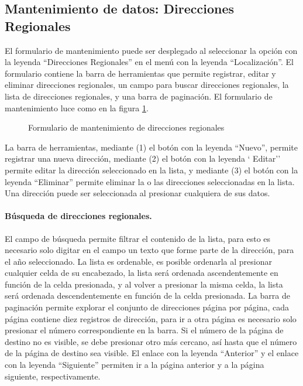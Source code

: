 \documentclass[a4paper, 9pt, conference]{article}              %
\begin{document}
\subsection{Mantenimiento de datos: Direcciones Regionales}

El formulario de mantenimiento puede ser desplegado al seleccionar la opci\'on con la leyenda ``Direcciones Regionales'' en el men\'u con la leyenda ``Localizaci\'on''. El formulario contiene la barra de herramientas que permite registrar, editar y eliminar direcciones regionales, un campo para buscar direcciones regionales, la lista de direcciones regionales, y una barra de paginaci\'on. El formulario de mantenimiento luce como en la figura \ref{fig:georegionals}.

\begin{figure}
	\centering
		\caption{Formulario de mantenimiento de direcciones regionales}
	\label{fig:georegionals}
\end{figure}

La barra de herramientas, mediante (1) el bot\'on con la leyenda ``Nuevo'', permite registrar una nueva direcci\'on, mediante (2) el bot\'on con la leyenda ` Editar'' permite editar la direcci\'on seleccionado en la lista, y mediante (3) el bot\'on con la leyenda ``Eliminar'' permite eliminar la o las direcciones seleccionadas en la lista. Una direcci\'on puede ser seleccionada al presionar cualquiera de sus datos.

\paragraph{B\'usqueda de direcciones regionales.}

El campo de b\'usqueda permite filtrar el contenido de la lista, para esto es necesario solo digitar en el campo un texto que forme parte de la direcci\'on, para el a\~no seleccionado. La lista es ordenable, es posible ordenarla al presionar cualquier celda de su encabezado, la lista ser\'a ordenada ascendentemente en funci\'on de la celda presionada, y al volver a presionar la misma celda, la lista ser\'a ordenada descendentemente en funci\'on de la celda presionada. La barra de paginaci\'on permite explorar el conjunto de direcciones p\'agina por p\'agina, cada p\'agina contiene diez registros de direcci\'on, para ir a otra p\'agina es necesario solo presionar el n\'umero correspondiente en la barra. Si el n\'umero de la p\'agina de destino no es visible, se debe presionar otro m\'as cercano, as\'i hasta que el n\'umero de la p\'agina de destino sea visible. El enlace con la leyenda ``Anterior'' y el enlace con la leyenda ``Siguiente'' permiten ir a la p\'agina anterior y a la p\'agina siguiente, respectivamente.
\end{document}
